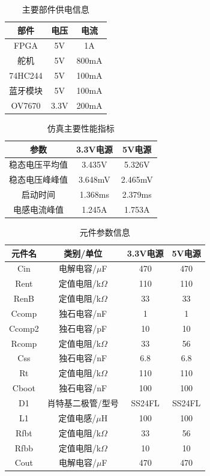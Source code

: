 \documentclass[a4paper]{paper}
\begin{document}
\begin{multicols}{2}
    \begin{table}[H]
        \centering
        \caption{主要部件供电信息}
        \label{t1}
        \begin{tabular}{|c|c|c|} \hline
            部件& 电压& 电流\\ \hline
            FPGA& 5V& 1A \\ \hline
            舵机& 5V & 800mA \\ \hline
            74HC244 & 5V& 100mA\\ \hline
            蓝牙模块 & 5V& 100mA\\ \hline
            OV7670& 3.3V& 200mA \\ \hline
        \end{tabular}
    \end{table}
    \begin{table}[H]
        \centering
        \caption{仿真主要性能指标}
        \label{t3}
        \begin{tabular}{|c|c|c|} \hline
            参数&3.3V电源&5V电源\\ \hline
            稳态电压平均值& 3.435V&5.326V\\ \hline
            稳态电压峰峰值& 3.648mV &2.465mV\\ \hline
            启动时间& 1.368ms&2.379ms\\ \hline
            电感电流峰值& 1.245A&1.753A\\ \hline
        \end{tabular}
    \end{table}
\end{multicols}
\begin{table}
    \centering
    \caption{元件参数信息}
    \label{t2}
    \begin{tabular}{|c|c|c|c|} \hline
        元件名&类别/单位& 3.3V电源& 5V电源\\ \hline
        Cin&电解电容/$\mu$F&470&470\\ \hline
        Rent&定值电阻/k$\Omega$&110&110\\ \hline
        RenB&定值电阻/k$\Omega$&33&33\\ \hline
        Ccomp&独石电容/nF&1&1\\ \hline
        Ccomp2&独石电容/pF&10&10\\ \hline
        Rcomp&定值电阻/k$\Omega$&33&56\\ \hline
        Css&独石电容/nF&6.8&6.8\\ \hline
        Rt&定值电阻/k$\Omega$&110&110\\ \hline
        Cboot&独石电容/nF&100&100\\ \hline
        D1&肖特基二极管/型号&SS24FL&SS24FL\\ \hline
        L1&定值电感/$\mu$H&100&100\\ \hline
        Rfbt&定值电阻/k$\Omega$&33&56\\ \hline
        Rfbb&定值电阻/k$\Omega$&10&10\\ \hline
        Cout&电解电容/$\mu$F&470&470\\ \hline
    \end{tabular}
\end{table}
\end{document}
